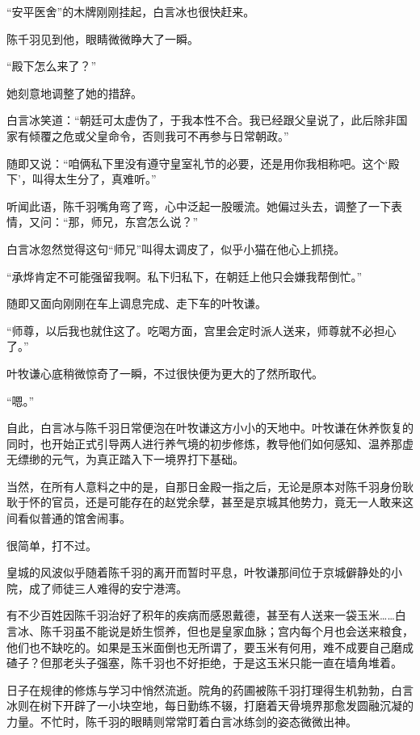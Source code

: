 “安平医舍”的木牌刚刚挂起，白言冰也很快赶来。

陈千羽见到他，眼睛微微睁大了一瞬。

“殿下怎么来了？”

她刻意地调整了她的措辞。

白言冰笑道：“朝廷可太虚伪了，于我本性不合。我已经跟父皇说了，此后除非国家有倾覆之危或父皇命令，否则我可不再参与日常朝政。”

随即又说：“咱俩私下里没有遵守皇室礼节的必要，还是用你我相称吧。这个‘殿下’，叫得太生分了，真难听。”

听闻此语，陈千羽嘴角弯了弯，心中泛起一股暖流。她偏过头去，调整了一下表情，又问：“那，师兄，东宫怎么说？”

白言冰忽然觉得这句“师兄”叫得太调皮了，似乎小猫在他心上抓挠。

“承烨肯定不可能强留我啊。私下归私下，在朝廷上他只会嫌我帮倒忙。”

随即又面向刚刚在车上调息完成、走下车的叶牧谦。

“师尊，以后我也就住这了。吃喝方面，宫里会定时派人送来，师尊就不必担心了。”

叶牧谦心底稍微惊奇了一瞬，不过很快便为更大的了然所取代。

“嗯。”

自此，白言冰与陈千羽日常便泡在叶牧谦这方小小的天地中。叶牧谦在休养恢复的同时，也开始正式引导两人进行养气境的初步修炼，教导他们如何感知、温养那虚无缥缈的元气，为真正踏入下一境界打下基础。

当然，在所有人意料之中的是，自那日金殿一指之后，无论是原本对陈千羽身份耿耿于怀的官员，还是可能存在的赵党余孽，甚至是京城其他势力，竟无一人敢来这间看似普通的馆舍闹事。

很简单，打不过。

\vspace{2em}

皇城的风波似乎随着陈千羽的离开而暂时平息，叶牧谦那间位于京城僻静处的小院，成了师徒三人难得的安宁港湾。

有不少百姓因陈千羽治好了积年的疾病而感恩戴德，甚至有人送来一袋玉米……白言冰、陈千羽虽不能说是娇生惯养，但也是皇家血脉；宫内每个月也会送来粮食，他们也不缺吃的。如果是玉米面倒也无所谓了，要玉米有何用，难不成要自己磨成碴子？但那老头子强塞，陈千羽也不好拒绝，于是这玉米只能一直在墙角堆着。

日子在规律的修炼与学习中悄然流逝。院角的药圃被陈千羽打理得生机勃勃，白言冰则在树下开辟了一小块空地，每日勤练不辍，打磨着天骨境界那愈发圆融沉凝的力量。不忙时，陈千羽的眼睛则常常盯着白言冰练剑的姿态微微出神。

